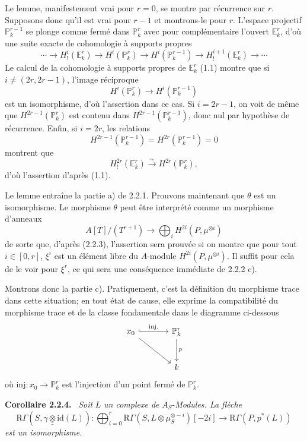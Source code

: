 \documentclass[11pt]{article}
\newenvironment{statement}[1]{\par\medskip\noindent\textbf{#1.}\ }{\par\medskip}
\newcommand{\R}{\mathrm{R}}\newcommand{\RHomCore}{\mathrm{RHom}}
\providecommand{\R}{\mathrm R}
\begin{document}
Le lemme, manifestement vrai pour $r=0$, se montre par récurrence sur $r$. Supposons donc qu'il est vrai pour $r-1$ et montrons-le pour $r$. L'espace projectif $\mathbb P_k^{r-1}$ se plonge comme fermé dans $\mathbb P_k^r$ avec pour complémentaire l'ouvert $\mathbb E_k^r$, d'où une suite exacte de cohomologie à supports propres
\[
\cdots\longrightarrow H_!^i(\mathbb E_k^r)\longrightarrow H^i(\mathbb P_k^r)
\longrightarrow H^i(\mathbb P_k^{r-1})\longrightarrow H_!^{i+1}(\mathbb E_k^r)\longrightarrow\cdots
\]
Le calcul de la cohomologie à supports propres de $\mathbb E_k^r$ (1.1) montre que si $i\ne(2r,2r-1)$, l'image réciproque
\[
H^i(\mathbb P_k^r)\longrightarrow H^i(\mathbb P_k^{r-1})
\]
est un isomorphisme, d'où l'assertion dans ce cas. Si $i=2r-1$, on voit de même que $H^{2r-1}(\mathbb P_k^r)$ est contenu dans $H^{2r-1}(\mathbb P_k^{r-1})$, donc nul par hypothèse de récurrence. Enfin, si $i=2r$, les relations
\[
H^{2r-1}(\mathbb P_k^{r-1})=H^{2r}(\mathbb P_k^{r-1})=0
\]
montrent que
\[
H_!^{2r}(\mathbb E_k^r)\xrightarrow{\sim}H^{2r}(\mathbb P_k^r),
\]
d'où l'assertion d'après (1.1).

Le lemme entraîne la partie a) de 2.2.1. Prouvons maintenant que $\theta$ est un isomorphisme. Le morphisme $\theta$ peut être interprété comme un morphisme d'anneaux
\[
A[T]/(T^{r+1})\longrightarrow\bigoplus_i H^{2i}(P,\mu^{\otimes i})
\]
de
sorte que, d'après (2.2.3), l'assertion sera prouvée si on montre que pour tout $i\in[0,r]$, $\xi^i$ est un élément libre du $A$-module $H^{2i}(P,\mu^{\otimes i})$. Il suffit pour cela de le voir pour $\xi^r$, ce qui sera une conséquence immédiate de 2.2.2 c).

Montrons donc la partie c). Pratiquement, c'est la définition du morphisme trace dans cette situation; en tout état de cause, elle exprime la compatibilité du morphisme trace et de la classe fondamentale dans le diagramme ci-dessous
\[
\begin{tikzcd}[column sep=large,row sep=large]
x_0 \arrow[r,hook,"\mathrm{inj.}"] \arrow[dr] & \mathbb P^r_k \arrow[d,"p"]\\
& k
\end{tikzcd}
\]
où $\mathrm{inj}:x_0\to \mathbb P^r_k$ est l'injection d'un point fermé de $\mathbb P^r_k$.

\begin{statement}{Corollaire 2.2.4}
\emph{Soit} $L$ \emph{un complexe de} $A_S$-\emph{Modules. La flèche}
\[
\R\Gamma(S,\gamma\mathbin{\underline{\underline{\otimes}}}\mathrm{id}(L)):
\bigoplus_{i=0}^r \R\Gamma(S,L\otimes\mu_S^{\otimes -i})[-2i]
\longrightarrow
\R\Gamma(P,p^*(L))
\]
\emph{est un isomorphisme}.
\end{statement}
\end{document}
